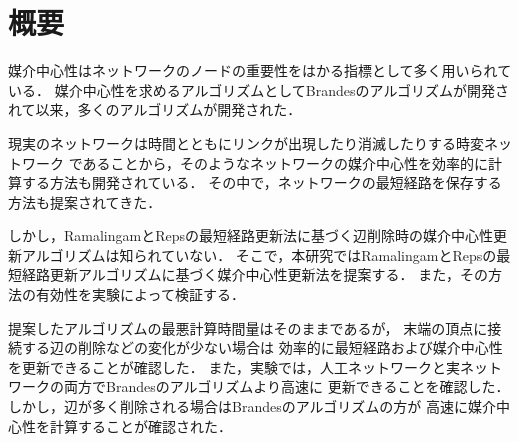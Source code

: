 \chapter*{概要}

媒介中心性はネットワークのノードの重要性をはかる指標として多く用いられている．
媒介中心性を求めるアルゴリズムとしてBrandesのアルゴリズムが開発されて以来，多くのアルゴリズムが開発された．

現実のネットワークは時間とともにリンクが出現したり消滅したりする時変ネットワーク
であることから，そのようなネットワークの媒介中心性を効率的に計算する方法も開発されている．
その中で，ネットワークの最短経路を保存する方法も提案されてきた．

しかし，RamalingamとRepsの最短経路更新法に基づく辺削除時の媒介中心性更新アルゴリズムは知られていない．
そこで，本研究ではRamalingamとRepsの最短経路更新アルゴリズムに基づく媒介中心性更新法を提案する．
また，その方法の有効性を実験によって検証する．

提案したアルゴリズムの最悪計算時間量はそのままであるが，
末端の頂点に接続する辺の削除などの変化が少ない場合は
効率的に最短経路および媒介中心性を更新できることが確認した．
また，実験では，人工ネットワークと実ネットワークの両方でBrandesのアルゴリズムより高速に
更新できることを確認した．しかし，辺が多く削除される場合はBrandesのアルゴリズムの方が
高速に媒介中心性を計算することが確認された．
